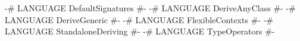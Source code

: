 \begin{code}
{-# LANGUAGE DefaultSignatures  #-}
{-# LANGUAGE DeriveAnyClass     #-}
{-# LANGUAGE DeriveGeneric      #-}
{-# LANGUAGE FlexibleContexts   #-}
{-# LANGUAGE StandaloneDeriving #-}
{-# LANGUAGE TypeOperators      #-}
\end{code}
